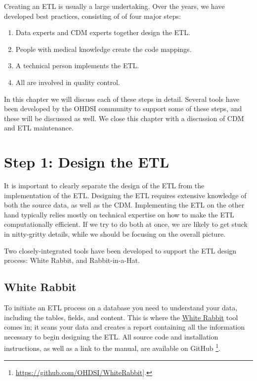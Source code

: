 \documentclass[11pt]{book}
\providecommand{\tightlist}{%
  \setlength{\itemsep}{0pt}\setlength{\parskip}{0pt}}
\let\rmarkdownfootnote\footnote%
\def\footnote{\protect\rmarkdownfootnote}
\theoremstyle{definition}
\theoremstyle{definition}
\theoremstyle{definition}
\theoremstyle{remark}
\begin{document}
Creating an ETL is usually a large undertaking. Over the years, we have developed best practices, consisting of of four major steps:

\begin{enumerate}
\def\labelenumi{\arabic{enumi}.}
\tightlist
\item
  Data experts and CDM experts together design the ETL.
\item
  People with medical knowledge create the code mappings.
\item
  A technical person implements the ETL.
\item
  All are involved in quality control.
\end{enumerate}

In this chapter we will discuss each of these steps in detail. Several tools have been developed by the OHDSI community to support some of these steps, and these will be discussed as well. We close this chapter with a discussion of CDM and ETL maintenance.

\hypertarget{step-1-design-the-etl}{%
\section{Step 1: Design the ETL}\label{step-1-design-the-etl}}

It is important to clearly separate the design of the ETL from the implementation of the ETL. Designing the ETL requires extensive knowledge of both the source data, as well as the CDM. Implementing the ETL on the other hand typically relies mostly on technical expertise on how to make the ETL computationally efficient. If we try to do both at once, we are likely to get stuck in nitty-gritty details, while we should be focusing on the overall picture.

Two closely-integrated tools have been developed to support the ETL design process: White Rabbit, and Rabbit-in-a-Hat.

\hypertarget{white-rabbit}{%
\subsection{White Rabbit}\label{white-rabbit}}

To initiate an ETL process on a database you need to understand your data, including the tables, fields, and content. This is where the \href{https://github.com/OHDSI/WhiteRabbit}{White Rabbit} tool comes in; it scans your data and creates a report containing all the information necessary to begin designing the ETL. All source code and installation instructions, as well as a link to the manual, are available on GitHub \footnote{\url{https://github.com/OHDSI/WhiteRabbit}{]}.}.
\end{document}
